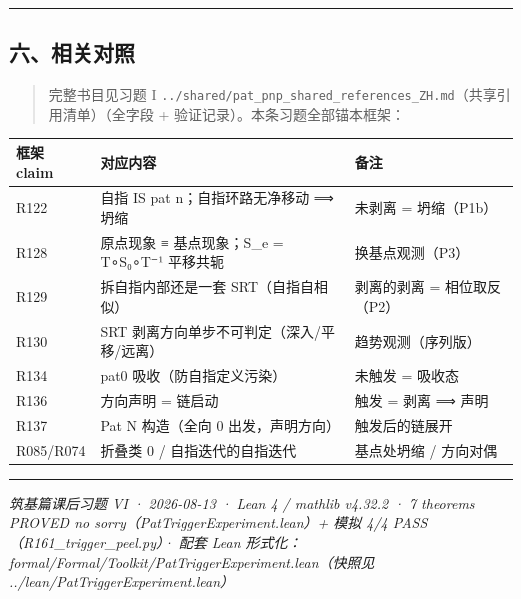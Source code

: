 \documentclass[
]{article}
\newcounter{none} %
\begin{document}
\begin{center}\rule{0.5\linewidth}{0.5pt}\end{center}

\subsection{六、相关对照}\label{ux516dux76f8ux5173ux5bf9ux7167}

\begin{quote}
完整书目见习题 I
\texttt{../shared/pat\_pnp\_shared\_references\_ZH.md}（共享引用清单）（全字段
+ 验证记录）。本条习题全部锚本框架：
\end{quote}

{\def\LTcaptype{none} %
\begin{longtable}[]{@{}
  >{\raggedright\arraybackslash}p{}
  >{\raggedright\arraybackslash}p{}
  >{\raggedright\arraybackslash}p{}@{}}
\toprule\noalign{}
\begin{minipage}[b]{\linewidth}\raggedright
框架 claim
\end{minipage} & \begin{minipage}[b]{\linewidth}\raggedright
对应内容
\end{minipage} & \begin{minipage}[b]{\linewidth}\raggedright
备注
\end{minipage} \\
\midrule\noalign{}
\endhead
\bottomrule\noalign{}
\endlastfoot
R122 & 自指 IS pat n；自指环路无净移动 ⟹ 坍缩 & 未剥离 = 坍缩（P1b） \\
R128 & 原点现象 ≡ 基点现象；S\_e = T∘S₀∘T⁻¹ 平移共轭 &
换基点观测（P3） \\
R129 & 拆自指内部还是一套 SRT（自指自相似） & 剥离的剥离 =
相位取反（P2） \\
R130 & SRT 剥离方向单步不可判定（深入/平移/远离） &
趋势观测（序列版） \\
R134 & pat0 吸收（防自指定义污染） & 未触发 = 吸收态 \\
R136 & 方向声明 = 链启动 & 触发 = 剥离 ⟹ 声明 \\
R137 & Pat N 构造（全向 0 出发，声明方向） & 触发后的链展开 \\
R085/R074 & 折叠类 0 / 自指迭代的自指迭代 & 基点处坍缩 / 方向对偶 \\
\end{longtable}
}

\begin{center}\rule{0.5\linewidth}{0.5pt}\end{center}

\emph{筑基篇课后习题 VI · 2026-08-13 · Lean 4 / mathlib v4.32.2 · 7
theorems PROVED no sorry（PatTriggerExperiment.lean）+ 模拟 4/4
PASS（R161\_trigger\_peel.py）· 配套 Lean
形式化：formal/Formal/Toolkit/PatTriggerExperiment.lean（快照见
../lean/PatTriggerExperiment.lean）}
\end{document}
